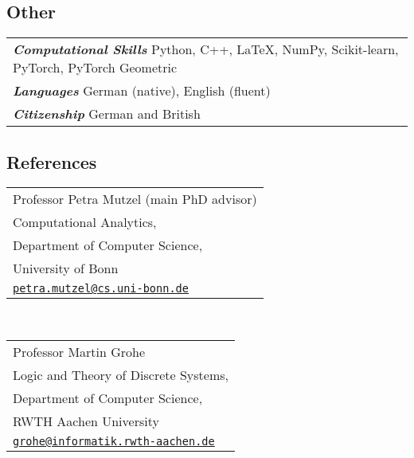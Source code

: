 \documentclass[11pt, a4paper, DIV=14, headings=small]{scrartcl}
\begin{document}
	\subsection*{Other}
	
	\begin{tabular}{l}
		\textsf{\textbf{\em Computational Skills}} Python, C\hspace{-1pt}+\hspace{-1pt}+, \LaTeX, NumPy, Scikit-learn, PyTorch, PyTorch Geometric \\
		\textsf{\textbf{\em Languages}} German (native), English (fluent)                                                                         \\
		\textsf{\textbf{\em Citizenship}} German and British\\
	\end{tabular}
		\renewcommand{\arraystretch}{1.0}
	\subsection*{References}
	
	\begin{tabular}{l}
		Professor Petra Mutzel (main PhD advisor)                                       \\
		Computational Analytics,                                                        \\
		Department of Computer Science,                                                 \\
		University of Bonn                                                              \\
		\href{mailto:petra.mutzel@cs.uni-bonn.de}{\texttt{petra.mutzel@cs.uni-bonn.de}} \\
	\end{tabular}\\[0.5em]
	
	
	\begin{tabular}{l}
		Professor Martin Grohe                                                    \\
		Logic and Theory of Discrete Systems,                                                   \\
		Department of Computer Science,                                                         \\
		RWTH Aachen University                                                                  \\
		\href{mailto:grohe@informatik.rwth-aachen.de}{\texttt{grohe@informatik.rwth-aachen.de}} \\
	\end{tabular}\\[0.5em]
	
\end{document}
